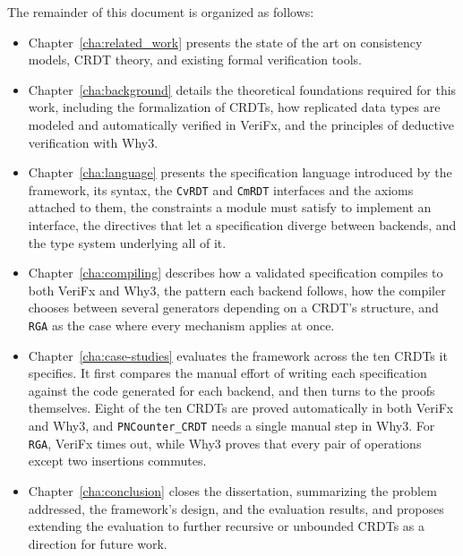 The remainder of this document is organized as follows:

\begin{itemize}
    \item Chapter~\ref{cha:related_work} presents the state of the art on consistency models, CRDT theory, and existing formal verification tools.
    \item Chapter~\ref{cha:background} details the theoretical foundations required for this work, including the formalization of CRDTs, how replicated data types are modeled and automatically verified in VeriFx, and the principles of deductive verification with Why3.
    \item Chapter~\ref{cha:language} presents the specification language introduced by the framework, its syntax, the
        \texttt{CvRDT} and \texttt{CmRDT} interfaces and the axioms attached to them, the constraints a module must
        satisfy to implement an interface, the directives that let a specification diverge between backends, and the
        type system underlying all of it.
    \item Chapter~\ref{cha:compiling} describes how a validated specification compiles to both VeriFx and Why3, the
        pattern each backend follows, how the compiler chooses between several generators depending on a CRDT's structure,
        and \texttt{RGA} as the case where every mechanism applies at once.
    \item Chapter~\ref{cha:case-studies} evaluates the framework across the ten CRDTs it specifies. It first compares the
        manual effort of writing each specification against the code generated for each backend, and then turns to the
        proofs themselves. Eight of the ten CRDTs are proved automatically in both VeriFx and Why3, and
        \texttt{PNCounter\_CRDT} needs a single manual step in Why3. For \texttt{RGA}, VeriFx times out, while Why3 proves
        that every pair of operations except two insertions commutes.
    \item Chapter~\ref{cha:conclusion} closes the dissertation, summarizing the problem addressed, the framework's
        design, and the evaluation results, and proposes extending the evaluation to further recursive or unbounded
        CRDTs as a direction for future work.
\end{itemize}
